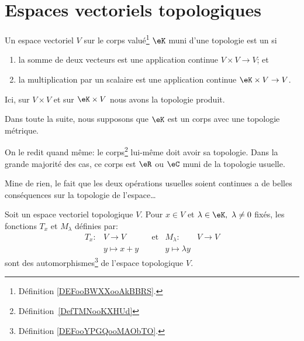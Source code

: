 
\section{Espaces vectoriels topologiques}

\begin{definition}\label{DefEVTopologique}
	Un espace vectoriel \( V\) sur le corps valué\footnote{Définition \ref{DEFooBWXXooAkBBRS}.} \( \eK\) muni d'une topologie est un  si
	\begin{enumerate}
		\item
		      la somme de deux vecteurs est une application continue \( V\times V\to V \); et
		\item
		      la multiplication par un scalaire est une application continue \( \eK\times V\to V\).
	\end{enumerate}
	Ici, sur \( V\times V\) et sur \( \eK\times V\) nous avons la topologie produit.

	Dans toute la suite, nous supposons que \( \eK\) est un corps avec une topologie métrique.
\end{definition}
On le redit quand même: le corps\footnote{Définition~\ref{DefTMNooKXHUd}} lui-même doit avoir sa topologie. Dans la grande majorité des cas, ce corps est \( \eR\) ou \( \eC\) muni de la topologie usuelle.

Mine de rien, le fait que les deux opérations usuelles soient continues a de belles conséquences sur la topologie de l'espace\dots

\begin{proposition}      \label{PROPooDXLFooFghbWk}
	Soit un espace vectoriel topologique \( V\). Pour \(x \in V \) et \(\lambda \in \eK, \ \lambda \neq 0 \) fixés, les fonctions \( T_x \) et \( M_\lambda \) définies par:
	\begin{align}
		T_x: & V \to V       &  & \text{et} & M_\lambda:          & V \to V \\
		     & y \mapsto x+y &  &           & y \mapsto \lambda y
	\end{align}
	sont des automorphismes\footnote{Définition \ref{DEFooYPGQooMAObTO}.} de l'espace topologique \(V \).
\end{proposition}

